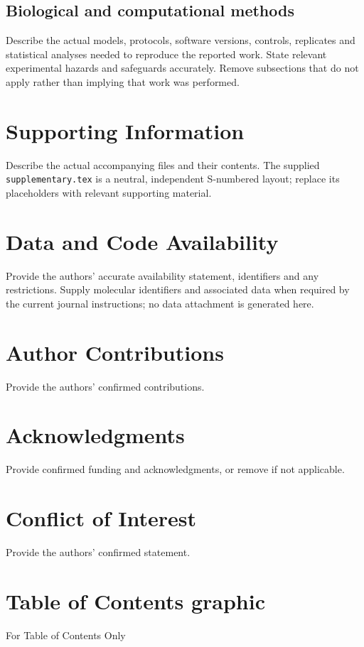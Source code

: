 \documentclass[letterpaper,12pt]{article}
\begin{document}
\subsection{Biological and computational methods}
Describe the actual models, protocols, software versions, controls,
replicates and statistical analyses needed to reproduce the reported work.
State relevant experimental hazards and safeguards accurately. Remove
subsections that do not apply rather than implying that work was performed.

\section*{Supporting Information}
Describe the actual accompanying files and their contents. The supplied
\texttt{supplementary.tex} is a neutral, independent S-numbered layout;
replace its placeholders with relevant supporting material.
\section*{Data and Code Availability}
Provide the authors' accurate availability statement, identifiers and any
restrictions. Supply molecular identifiers and associated data when required
by the current journal instructions; no data attachment is generated here.
\section*{Author Contributions}
Provide the authors' confirmed contributions.
\section*{Acknowledgments}
Provide confirmed funding and acknowledgments, or remove if not applicable.
\section*{Conflict of Interest}
Provide the authors' confirmed statement.



\clearpage
\section*{Table of Contents graphic}
\noindent For Table of Contents Only
\begin{center}
\end{center}
\end{document}
